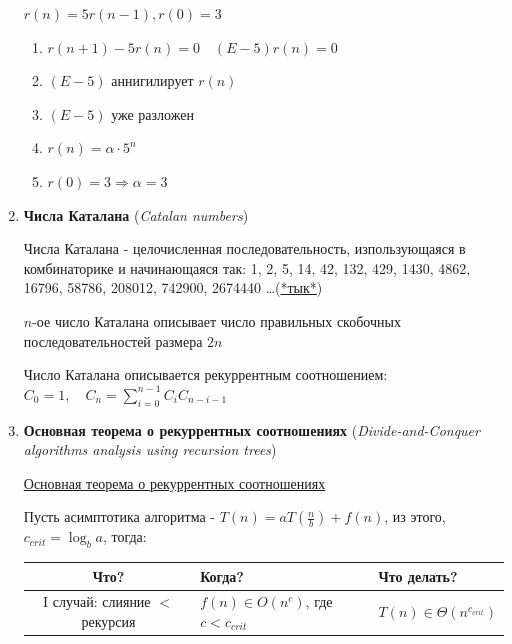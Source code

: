\documentclass[12pt]{article}
\begin{document}
\begin{enumerate}
        \vspace{3mm}

        \Exs $r(n) = 5r(n - 1), r(0) = 3$

        \begin{enumerate}
            \item $r(n + 1) - 5r(n) = 0 \quad (E - 5)r(n) = 0$

            \item $(E - 5)$ аннигилирует $r(n)$

            \item $(E - 5)$ уже разложен

            \item $r(n) = \alpha \cdot 5^n$

            \item $r(0) = 3 \Longrightarrow \alpha = 3$
        \end{enumerate}

        \item \textbf{Числа Каталана} (\textit{Catalan numbers})

        Числа Каталана - целочисленная последовательность, изпользующаяся в комбинаторике и начинающаяся так: 1, 2, 5, 14, 42, 132, 429, 1430, 4862, 16796, 58786, 208012, 742900, 2674440 \dots (\href{https://oeis.org/A000108}{*тык*})

        $n$-ое число Каталана описывает число правильных скобочных последовательностей размера $2n$

        Число Каталана описывается рекуррентным соотношением: $C_0 = 1, \quad C_n = \sum_{i = 0}^{n - 1} C_{i} C_{n - i - 1}$

        \item \textbf{Основная теорема о рекуррентных соотношениях} (\textit{Divide-and-Conquer algorithms analysis using recursion trees})

        \hyperlink{mastertheorem}{Основная теорема о рекуррентных соотношениях}

        Пусть асимптотика алгоритма - $T(n) = aT\left(\frac{n}{b}\right) + f(n)$, из этого, $c_{crit} = \log_b a$, тогда:

        \begin{tabular}{cll}
            \hline

            Что? & \hfil Когда? & \hfil Что делать? \\

            \hline

            I случай: слияние $<$ рекурсия & $f(n) \in O(n^c)$, где $c < c_{crit}$ & $T(n) \in \Theta(n^{c_{crit}})$ \\


\end{tabular}
\end{enumerate}
\end{document}
